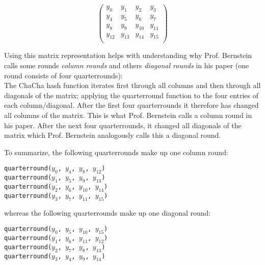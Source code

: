\begin{equation*}
\begin{pmatrix}
y_0 & y_1 & y_2 & y_3 \\
y_4 & y_5 & y_6 & y_7 \\
y_8 & y_9 & y_{10} & y_{11} \\
y_{12} & y_{13} & y_{14} & y_{15}\\
\end{pmatrix}
\end{equation*}

\noindent Using this matrix representation helps with understanding why Prof. Bernstein calls some rounds \textit{column rounds} and others \textit{diagonal rounds} in his paper (one round consists of four quarterrounds): \\
The ChaCha hash function iterates first through all columns and then through all diagonals of the matrix; applying the quarterround function to the four entries of each column/diagonal. After the first four quarterrounds it therefore has changed all columns of the matrix. This is what Prof. Bernstein calls a column round in his paper. After the next four quarterrounds, it changed all diagonals of the matrix which Prof. Bernstein analogously calls this a diagonal round.

\noindent To summarize, the following quarterrounds make up one column round:
\begin{center}
\begin{minipage}{0.5\linewidth}
\texttt{quarterround($y_0$, $y_4$, $y_8$, $y_{12}$)} \\
\texttt{quarterround($y_1$, $y_5$, $y_9$, $y_{13}$)} \\
\texttt{quarterround($y_2$, $y_6$, $y_{10}$, $y_{14}$)} \\
\texttt{quarterround($y_3$, $y_7$, $y_{11}$, $y_{15}$)} \\
\end{minipage}
\end{center}
\noindent whereas the following quarterrounds make up one diagonal round:
\begin{center}
\begin{minipage}{0.5\linewidth}
\texttt{quarterround($y_0$, $y_5$, $y_{10}$, $y_{15}$)} \\
\texttt{quarterround($y_1$, $y_6$, $y_{11}$, $y_{12}$)} \\
\texttt{quarterround($y_2$, $y_7$, $y_8$, $y_{13}$)} \\
\texttt{quarterround($y_3$, $y_4$, $y_9$, $y_{14}$)} \\
\end{minipage}
\end{center}

